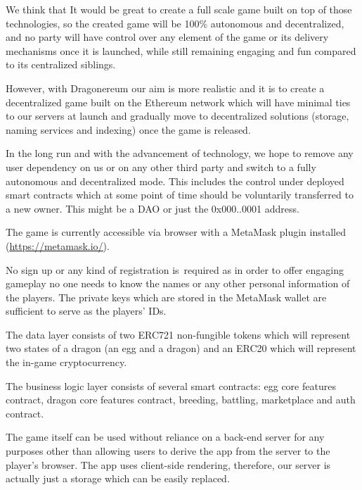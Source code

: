 \documentclass[12pt]{article}
\begin{document}
We think that It would be great to create a full scale game built on top of those technologies,  so the created game will be 100$\%$  autonomous and decentralized, and no party will have control over any element of the game or its delivery mechanisms once it is launched, while still remaining engaging and fun compared to its centralized siblings.\par

However, with Dragonereum our aim is more realistic and it is to create a decentralized game built on the Ethereum network which will have minimal ties to our servers at launch and gradually move to decentralized solutions (storage, naming services and indexing) once the game is released.\par

In the long run and with the advancement of technology, we hope to remove any user dependency on us or on any other third party and switch to a fully autonomous and decentralized mode. This includes the control under deployed smart contracts which at some point of time should be voluntarily transferred to a new owner. This might be a DAO or just the 0x000..0001 address.\par

The game is currently accessible via browser with a MetaMask plugin installed (\href{https://metamask.io/}{\textcolor[HTML]{1155CC}{\uline{https://metamask.io/}}}).\par

No sign up or any kind of registration is\ required as in order to offer engaging gameplay no one  needs to know the names or any other personal information of the players. The private keys which are stored in the MetaMask wallet are sufficient to serve as the players’ IDs.\par

The data layer consists of two ERC721  \cite{Ethereum_2017_Sep_26}  non-fungible tokens which will represent two states of a dragon (an egg and a dragon) and an ERC20  \cite{Ethereum_2015_Nov_19}  which will represent the in-game cryptocurrency. \par

The business logic layer consists of several smart contracts: egg core features contract, dragon core features contract, breeding, battling, marketplace and auth contract.\par

The game itself can be used without reliance on a back-end server for any purposes other than allowing users to derive the app from the server to the player’s browser. The app uses client-side rendering, therefore, our server is actually just a storage which can be easily replaced.\par
\end{document}
